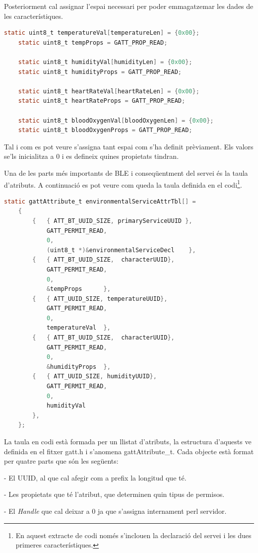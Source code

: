 Posteriorment cal assignar l'espai necessari per poder emmagatzemar les dades de les característiques.

\begin{lstlisting}[language=C]
	static uint8_t temperatureVal[temperatureLen] = {0x00};
	static uint8_t tempProps = GATT_PROP_READ;
	
	static uint8_t humidityVal[humidityLen] = {0x00};
	static uint8_t humidityProps = GATT_PROP_READ;
	
	static uint8_t heartRateVal[heartRateLen] = {0x00};
	static uint8_t heartRateProps = GATT_PROP_READ;
	
	static uint8_t bloodOxygenVal[bloodOxygenLen] = {0x00};
	static uint8_t bloodOxygenProps = GATT_PROP_READ;
\end{lstlisting}

Tal i com es pot veure s'assigna tant espai com s'ha definit prèviament.
Els valors se'ls inicialitza a 0 i es defineix quines propietats tindran.

Una de les parts més importants de BLE i conseqüentment del servei és la taula d'atributs.
A continuació es pot veure com queda la taula definida en el codi\footnote{En aquest extracte de codi només s'inclouen la declaració del servei i les dues primeres característiques.}.

\begin{lstlisting}[language=C]
	static gattAttribute_t environmentalServiceAttrTbl[] =
	{
		{	{ ATT_BT_UUID_SIZE, primaryServiceUUID },
			GATT_PERMIT_READ,
			0,
			(uint8_t *)&environmentalServiceDecl	},
		{	{ ATT_BT_UUID_SIZE,  characterUUID},
			GATT_PERMIT_READ,
			0,
			&tempProps		},
		{	{ ATT_UUID_SIZE, temperatureUUID},
			GATT_PERMIT_READ,
			0,
			temperatureVal	},
		{	{ ATT_BT_UUID_SIZE,  characterUUID},
			GATT_PERMIT_READ,
			0,
			&humidityProps	},
		{	{ ATT_UUID_SIZE, humidityUUID},
			GATT_PERMIT_READ,
			0,
			humidityVal
		},
	};
\end{lstlisting}

La taula en codi està formada per un llistat d'atributs, la estructura d'aquests ve definida en el fitxer gatt.h i s'anomena gattAttribute\_t.
Cada objecte està format per quatre parts que són les següents:

- El UUID, al que cal afegir com a prefix la longitud que té.

- Les propietats que té l'atribut, que determinen quin tipus de permisos.

- El \textit{Handle} que cal deixar a 0 ja que s'assigna internament perl servidor.

